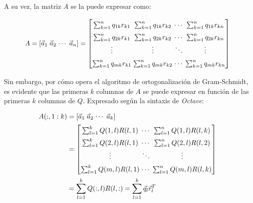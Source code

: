 \documentclass[spanish]{article}
\begin{document}
            A su vez, la matriz $A$ se la puede expresar como:
            
            \begin{equation}
                A = 
                \arraycolsep=1.4pt\def\arraystretch{0.9}
                \begin{bmatrix}
                    \vec{a}_{1} & \vec{a}_{2} & \cdots & \vec{a}_{n} 
                \end{bmatrix}
                =
                \arraycolsep=1.4pt\def\arraystretch{1.5}
                \begin{bmatrix}
                    \sum_{k = 1}^{n} q_{1 k} r_{k 1} & \sum_{k = 1}^{n} q_{1 k} r_{k 2} & \cdots & \sum_{k = 1}^{n} q_{1 k} r_{k n} \\
                    \sum_{k = 1}^{n} q_{2 k} r_{k 1} & \sum_{k = 1}^{n} q_{2 k} r_{k 2} & \cdots & \sum_{k = 1}^{n} q_{2 k} r_{k n} \\
                    \vdots & \vdots & \ddots & \vdots\\
                    \sum_{k = 1}^{n} q_{m k} r_{k 1} & \sum_{k = 1}^{n} q_{m k} r_{k 2} & \cdots & \sum_{k = 1}^{n} q_{m k} r_{k n}
                \end{bmatrix}
            \end{equation}
            
            
            \par Sin embargo, por cómo opera el algoritmo de ortogonalización de Gram-Schmidt, es evidente que las primeras $k$ columnas de $A$ se puede expresar en función de las primeras $k$ columnas de $Q$. Expresado según la sintaxis de \textit{Octave}:
            
            \begin{equation}
                \begin{split}
                    A(:,1:k) &= 
                    \arraycolsep=1.4pt\def\arraystretch{0.9}
                    \begin{bmatrix}
                        \vec{a}_{1} & \vec{a}_{2} & \cdots & \vec{a}_{k}
                    \end{bmatrix}
                    \\
                    &=
                    \arraycolsep=1.4pt\def\arraystretch{1.5}
                    \begin{bmatrix}
                        \sum_{l = 1}^{k} Q(1,l) R(l,1) & \cdots & \sum_{l = 1}^{n} Q(1,l) R(l,k) \\
                        \sum_{l = 1}^{k} Q(2,l) R(l,1) & \cdots & \sum_{l = 1}^{n} Q(2,l) R(l,2) \\
                        \vdots & \ddots & \vdots\\
                        \sum_{l = 1}^{k} Q(m,l) R(l,1) & \cdots & \sum_{l = 1}^{n} Q(m,l) R(l,k)
                    \end{bmatrix}
                    \\
                    &= \sum_{l = 1}^{k} Q(:,l) R(l,:) = \sum_{l = 1}^{k} \vec{q}_{l} \vec{r}^{T}_{l}
                \end{split}
            \end{equation}
            
\end{document}
